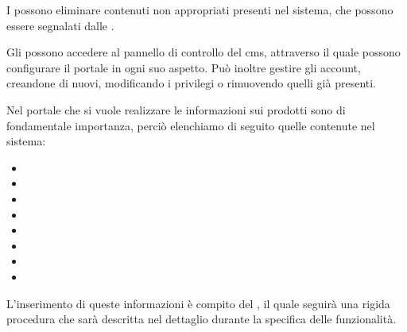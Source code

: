 I  possono eliminare contenuti non appropriati presenti nel sistema, che possono essere segnalati dalle .

Gli  possono accedere al pannello di controllo del \gls{cms}, attraverso il quale possono configurare il portale in ogni suo aspetto. Può inoltre gestire gli account, creandone di nuovi, modificando i privilegi o rimuovendo quelli già presenti. 

\bigskip
\noindent
Nel portale che si vuole realizzare le informazioni sui prodotti sono di fondamentale importanza, perciò elenchiamo di seguito quelle contenute nel sistema:
\begin{itemize}
	\item {}
	\item {}
	\item {}
	\item {}
	\item {}
	\item {}
	\item {}
	\item {}
\end{itemize}
L'inserimento di queste informazioni è compito del , il quale seguirà una rigida procedura che sarà descritta nel dettaglio durante la specifica delle funzionalità.



